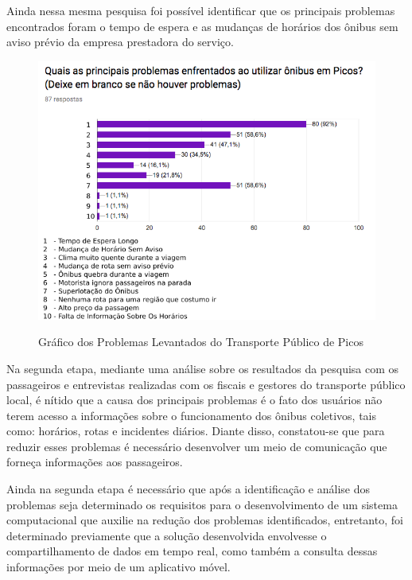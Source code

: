 Ainda nessa mesma pesquisa foi possível identificar que os principais problemas encontrados foram o tempo de espera e as mudanças de horários dos ônibus sem aviso prévio da empresa prestadora do serviço.

\begin{figure}[H]
\caption{Gráfico dos Problemas Levantados do Transporte Público de Picos}
\centering
\includegraphics[width=1.0\textwidth]{imagens/problema.png}
\label{fig:problema}
\end{figure}

Na segunda etapa, mediante uma análise sobre os resultados da pesquisa com os passageiros e entrevistas realizadas com os fiscais e gestores do transporte público local, é nítido que a causa dos principais problemas é o fato dos usuários não terem acesso a informações sobre o funcionamento dos ônibus coletivos, tais como: horários, rotas e incidentes diários. Diante disso, constatou-se que para reduzir esses problemas é necessário desenvolver um meio de comunicação que forneça informações aos passageiros.

Ainda na segunda etapa é necessário que após a identificação e análise dos problemas seja determinado os requisitos para o desenvolvimento de um sistema computacional que auxilie na redução dos problemas identificados, entretanto, foi determinado previamente que a solução desenvolvida envolvesse o compartilhamento de dados em tempo real, como também a consulta dessas informações por meio de um aplicativo móvel.

